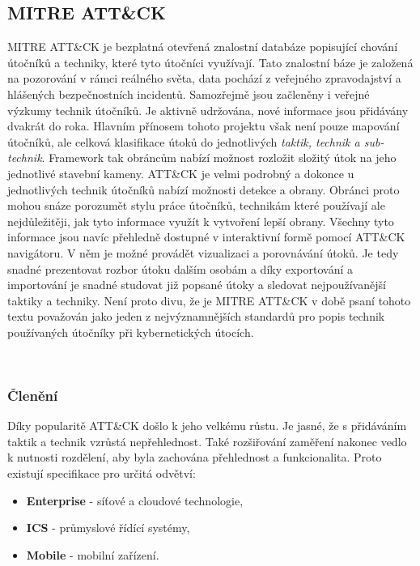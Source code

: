 \subsection{MITRE ATT\&CK}\label{subsec:mitre-att&ck}
MITRE ATT\&CK je bezplatná otevřená znalostní databáze popisující chování útočníků a techniky, které tyto útočníci využívají.
Tato znalostní báze je založená na pozorování v rámci reálného světa, data pochází z veřejného zpravodajství a hlášených bezpečnostních incidentů.
Samozřejmě jsou začleněny i veřejné výzkumy technik útočníků.
Je aktivně udržována, nové informace jsou přidávány dvakrát do roka\cite{mitre_attack_framework_faq}.
Hlavním přínosem tohoto projektu však není pouze mapování útočníků, ale celková klasifikace útoků do jednotlivých \textit{taktik, technik a sub-technik}.
Framework tak obráncům nabízí možnost rozložit složitý útok na jeho jednotlivé stavební kameny.
ATT\&CK je velmi podrobný a dokonce u jednotlivých technik útočníků nabízí možnosti detekce a obrany.
Obránci proto mohou snáze porozumět stylu práce útočníků, technikám které používají ale nejdůležitěji, jak tyto informace využít k vytvoření lepší obrany.
Všechny tyto informace jsou navíc přehledně dostupné v interaktivní formě pomocí ATT\&CK navigátoru\cite{mitre_attack_navigator}.
V něm je možné provádět vizualizaci a porovnávání útoků.
Je tedy snadné prezentovat rozbor útoku dalším osobám a díky exportování a importování je snadné studovat již popsané útoky a sledovat nejpoužívanější taktiky a techniky.
Není proto divu, že je MITRE ATT\&CK v době psaní tohoto textu považován jako jeden z nejvýznamnějších standardů pro popis technik používaných útočníky při kybernetických útocích.\cite{mitre_attack_framework}

~

\subsubsection{Členění}
Díky popularitě ATT\&CK došlo k jeho velkému růstu.
Je jasné, že s přidáváním taktik a technik vzrůstá nepřehlednost.
Také rozšiřování zaměření nakonec vedlo k nutnosti rozdělení, aby byla zachována přehlednost a funkcionalita.
Proto existují specifikace pro určitá odvětví:

\begin{itemize}
	\item \textbf{Enterprise} - síťové a cloudové technologie,
	\item \textbf{ICS} - průmyslové řídící systémy,
	\item \textbf{Mobile} - mobilní zařízení.
\end{itemize}

